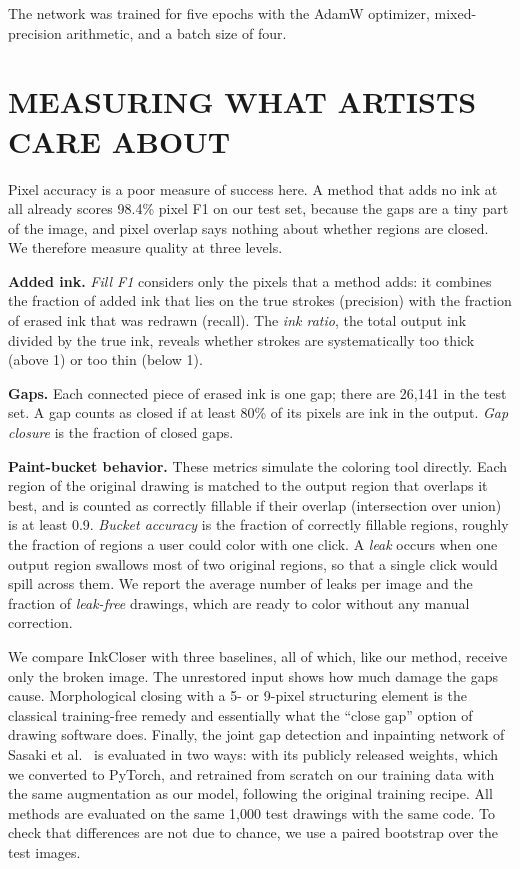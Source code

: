 \documentclass{IEEEcsmag}
\begin{document}
The network was trained for five epochs with the AdamW optimizer, mixed-precision
arithmetic, and a batch size of four.

\section{MEASURING WHAT ARTISTS CARE ABOUT}

Pixel accuracy is a poor measure of success here. A method that adds no ink at all
already scores 98.4\% pixel F1 on our test set, because the gaps are a tiny part of
the image, and pixel overlap says nothing about whether regions are closed. We
therefore measure quality at three levels.

\textbf{Added ink.} \emph{Fill F1} considers only the pixels that a method adds: it
combines the fraction of added ink that lies on the true strokes (precision) with the
fraction of erased ink that was redrawn (recall). The \emph{ink ratio}, the total
output ink divided by the true ink, reveals whether strokes are systematically too
thick (above 1) or too thin (below 1).

\textbf{Gaps.} Each connected piece of erased ink is one gap; there are 26,141 in the
test set. A gap counts as closed if at least 80\% of its pixels are ink in the
output. \emph{Gap closure} is the fraction of closed gaps.

\textbf{Paint-bucket behavior.} These metrics simulate the coloring tool directly.
Each region of the original drawing is matched to the output region that overlaps it
best, and is counted as correctly fillable if their overlap (intersection over
union) is at least 0.9. \emph{Bucket accuracy} is the fraction of correctly fillable
regions, roughly the fraction of regions a user could color with one click. A
\emph{leak} occurs when one output region swallows most of two original regions, so
that a single click would spill across them. We report the average number of leaks
per image and the fraction of \emph{leak-free} drawings, which are ready to color
without any manual correction.

We compare InkCloser with three baselines, all of which, like our method, receive
only the broken image. The unrestored input shows how much damage the gaps cause.
Morphological closing with a 5- or 9-pixel structuring element is the classical
training-free remedy and essentially what the ``close gap'' option of drawing software
does. Finally, the joint gap detection and inpainting network of Sasaki et
al.~\cite{sasaki2017joint} is evaluated in two ways: with its publicly released
weights, which we converted to PyTorch, and retrained from scratch on our training
data with the same augmentation as our model, following the original training
recipe. All methods are evaluated on the same 1,000 test drawings with the same code.
To check that differences are not due to chance, we use a paired bootstrap over the
test images.
\end{document}
